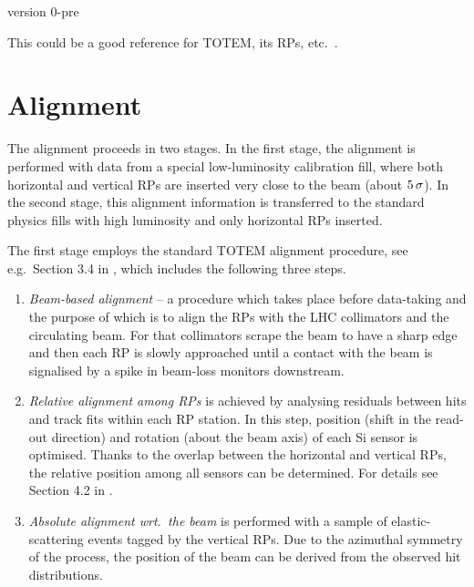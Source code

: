 \documentclass{article}
\def\un#1{\,{\rm #1}}
\begin{document}
\centerline{version 0-pre}
\vskip2cm


This could be a good reference for TOTEM, its RPs, etc.~\cite{totem-jinst}.

\section{Alignment}

The alignment proceeds in two stages. In the first stage, the alignment is performed with data from a special low-luminosity calibration fill, where both horizontal and vertical RPs are inserted very close to the beam (about $5\un{\sigma}$). In the second stage, this alignment information is transferred to the standard physics fills with high luminosity and only horizontal RPs inserted.

The first stage employs the standard TOTEM alignment procedure, see e.g.~Section 3.4 in \cite{totem-ijmp}, which includes the following three steps.
\begin{enumerate}[noitemsep]
\item {\em Beam-based alignment} -- a procedure which takes place before data-taking and the purpose of which is to align the RPs with the LHC collimators and the circulating beam. For that collimators scrape the beam to have a sharp edge and then each RP is slowly approached until a contact with the beam is signalised by a spike in beam-loss monitors downstream.
\item {\em Relative alignment among RPs} is achieved by analysing residuals between hits and track fits within each RP station. In this step, position (shift in the read-out direction) and rotation (about the beam axis) of each Si sensor is optimised. Thanks to the overlap between the horizontal and vertical RPs, the relative position among all sensors can be determined. For details see Section 4.2 in \cite{jan_thesis}.
\item {\em Absolute alignment wrt.~the beam} is performed with a sample of elastic-scattering events tagged by the vertical RPs. Due to the azimuthal symmetry of the process, the position of the beam can be derived from the observed hit distributions.
\end{enumerate}
\end{document}
